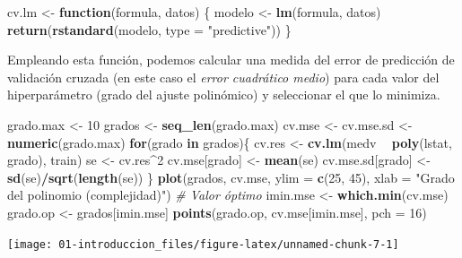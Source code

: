 \documentclass[]{book}
\newenvironment{Shaded}{\begin{snugshade}}{\end{snugshade}}
\newcommand{\KeywordTok}[1]{\textcolor[rgb]{0.13,0.29,0.53}{\textbf{#1}}}
\newcommand{\DataTypeTok}[1]{\textcolor[rgb]{0.13,0.29,0.53}{#1}}
\newcommand{\DecValTok}[1]{\textcolor[rgb]{0.00,0.00,0.81}{#1}}
\newcommand{\StringTok}[1]{\textcolor[rgb]{0.31,0.60,0.02}{#1}}
\newcommand{\CommentTok}[1]{\textcolor[rgb]{0.56,0.35,0.01}{\textit{#1}}}
\newcommand{\ControlFlowTok}[1]{\textcolor[rgb]{0.13,0.29,0.53}{\textbf{#1}}}
\newcommand{\OperatorTok}[1]{\textcolor[rgb]{0.81,0.36,0.00}{\textbf{#1}}}
\newcommand{\NormalTok}[1]{#1}
\theoremstyle{break}
\theoremstyle{definition}
\theoremstyle{definition}
\theoremstyle{definition}
\theoremstyle{remark}
\begin{document}
\begin{Shaded}
\begin{Highlighting}[]
\NormalTok{cv.lm <-}\StringTok{ }\ControlFlowTok{function}\NormalTok{(formula, datos) \{}
\NormalTok{    modelo <-}\StringTok{ }\KeywordTok{lm}\NormalTok{(formula, datos)}
    \KeywordTok{return}\NormalTok{(}\KeywordTok{rstandard}\NormalTok{(modelo, }\DataTypeTok{type =} \StringTok{"predictive"}\NormalTok{))}
\NormalTok{\}}
\end{Highlighting}
\end{Shaded}

Empleando esta función, podemos calcular una medida del error de
predicción de validación cruzada (en este caso el \emph{error cuadrático
medio}) para cada valor del hiperparámetro (grado del ajuste polinómico)
y seleccionar el que lo minimiza.

\begin{Shaded}
\begin{Highlighting}[]
\NormalTok{grado.max <-}\StringTok{ }\DecValTok{10}
\NormalTok{grados <-}\StringTok{ }\KeywordTok{seq_len}\NormalTok{(grado.max) }
\NormalTok{cv.mse <-}\StringTok{ }\NormalTok{cv.mse.sd <-}\StringTok{ }\KeywordTok{numeric}\NormalTok{(grado.max)}
\ControlFlowTok{for}\NormalTok{(grado }\ControlFlowTok{in}\NormalTok{ grados)\{}
\NormalTok{  cv.res <-}\StringTok{ }\KeywordTok{cv.lm}\NormalTok{(medv }\OperatorTok{~}\StringTok{ }\KeywordTok{poly}\NormalTok{(lstat, grado), train)}
\NormalTok{  se <-}\StringTok{ }\NormalTok{cv.res}\OperatorTok{^}\DecValTok{2}
\NormalTok{  cv.mse[grado] <-}\StringTok{ }\KeywordTok{mean}\NormalTok{(se)}
\NormalTok{  cv.mse.sd[grado] <-}\StringTok{ }\KeywordTok{sd}\NormalTok{(se)}\OperatorTok{/}\KeywordTok{sqrt}\NormalTok{(}\KeywordTok{length}\NormalTok{(se))}
\NormalTok{\}}
\KeywordTok{plot}\NormalTok{(grados, cv.mse, }\DataTypeTok{ylim =} \KeywordTok{c}\NormalTok{(}\DecValTok{25}\NormalTok{, }\DecValTok{45}\NormalTok{),}
  \DataTypeTok{xlab =} \StringTok{"Grado del polinomio (complejidad)"}\NormalTok{)}
\CommentTok{# Valor óptimo}
\NormalTok{imin.mse <-}\StringTok{ }\KeywordTok{which.min}\NormalTok{(cv.mse)}
\NormalTok{grado.op <-}\StringTok{ }\NormalTok{grados[imin.mse]}
\KeywordTok{points}\NormalTok{(grado.op, cv.mse[imin.mse], }\DataTypeTok{pch =} \DecValTok{16}\NormalTok{)}
\end{Highlighting}
\end{Shaded}

\begin{center}\texttt{[image: 01-introduccion\_files/figure-latex/unnamed-chunk-7-1]} \end{center}
\end{document}
